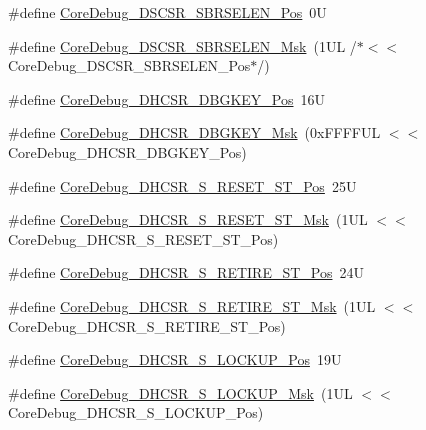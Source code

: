 \begin{DoxyCompactItemize}
\item 
\#define \mbox{\hyperlink{group___c_m_s_i_s___core_debug_ga3eb88e444b678057db1b59272eebb1ad}{Core\+Debug\+\_\+\+D\+S\+C\+S\+R\+\_\+\+S\+B\+R\+S\+E\+L\+E\+N\+\_\+\+Pos}}~0U
\item 
\#define \mbox{\hyperlink{group___c_m_s_i_s___core_debug_ga5e5ed94cac1139165af161c008881805}{Core\+Debug\+\_\+\+D\+S\+C\+S\+R\+\_\+\+S\+B\+R\+S\+E\+L\+E\+N\+\_\+\+Msk}}~(1\+U\+L /$\ast$$<$$<$ Core\+Debug\+\_\+\+D\+S\+C\+S\+R\+\_\+\+S\+B\+R\+S\+E\+L\+E\+N\+\_\+\+Pos$\ast$/)
\item 
\#define \mbox{\hyperlink{group___c_m_s_i_s___core_debug_gac91280edd0ce932665cf75a23d11d842}{Core\+Debug\+\_\+\+D\+H\+C\+S\+R\+\_\+\+D\+B\+G\+K\+E\+Y\+\_\+\+Pos}}~16U
\item 
\#define \mbox{\hyperlink{group___c_m_s_i_s___core_debug_ga1ce997cee15edaafe4aed77751816ffc}{Core\+Debug\+\_\+\+D\+H\+C\+S\+R\+\_\+\+D\+B\+G\+K\+E\+Y\+\_\+\+Msk}}~(0x\+F\+F\+F\+F\+U\+L $<$$<$ Core\+Debug\+\_\+\+D\+H\+C\+S\+R\+\_\+\+D\+B\+G\+K\+E\+Y\+\_\+\+Pos)
\item 
\#define \mbox{\hyperlink{group___c_m_s_i_s___core_debug_ga6f934c5427ea057394268e541fa97753}{Core\+Debug\+\_\+\+D\+H\+C\+S\+R\+\_\+\+S\+\_\+\+R\+E\+S\+E\+T\+\_\+\+S\+T\+\_\+\+Pos}}~25U
\item 
\#define \mbox{\hyperlink{group___c_m_s_i_s___core_debug_gac474394bcceb31a8e09566c90b3f8922}{Core\+Debug\+\_\+\+D\+H\+C\+S\+R\+\_\+\+S\+\_\+\+R\+E\+S\+E\+T\+\_\+\+S\+T\+\_\+\+Msk}}~(1\+U\+L $<$$<$ Core\+Debug\+\_\+\+D\+H\+C\+S\+R\+\_\+\+S\+\_\+\+R\+E\+S\+E\+T\+\_\+\+S\+T\+\_\+\+Pos)
\item 
\#define \mbox{\hyperlink{group___c_m_s_i_s___core_debug_ga2328118f8b3574c871a53605eb17e730}{Core\+Debug\+\_\+\+D\+H\+C\+S\+R\+\_\+\+S\+\_\+\+R\+E\+T\+I\+R\+E\+\_\+\+S\+T\+\_\+\+Pos}}~24U
\item 
\#define \mbox{\hyperlink{group___c_m_s_i_s___core_debug_ga89dceb5325f6bcb36a0473d65fbfcfa6}{Core\+Debug\+\_\+\+D\+H\+C\+S\+R\+\_\+\+S\+\_\+\+R\+E\+T\+I\+R\+E\+\_\+\+S\+T\+\_\+\+Msk}}~(1\+U\+L $<$$<$ Core\+Debug\+\_\+\+D\+H\+C\+S\+R\+\_\+\+S\+\_\+\+R\+E\+T\+I\+R\+E\+\_\+\+S\+T\+\_\+\+Pos)
\item 
\#define \mbox{\hyperlink{group___c_m_s_i_s___core_debug_ga2900dd56a988a4ed27ad664d5642807e}{Core\+Debug\+\_\+\+D\+H\+C\+S\+R\+\_\+\+S\+\_\+\+L\+O\+C\+K\+U\+P\+\_\+\+Pos}}~19U
\item 
\#define \mbox{\hyperlink{group___c_m_s_i_s___core_debug_ga7b67e4506d7f464ef5dafd6219739756}{Core\+Debug\+\_\+\+D\+H\+C\+S\+R\+\_\+\+S\+\_\+\+L\+O\+C\+K\+U\+P\+\_\+\+Msk}}~(1\+U\+L $<$$<$ Core\+Debug\+\_\+\+D\+H\+C\+S\+R\+\_\+\+S\+\_\+\+L\+O\+C\+K\+U\+P\+\_\+\+Pos)

\end{DoxyCompactItemize}
